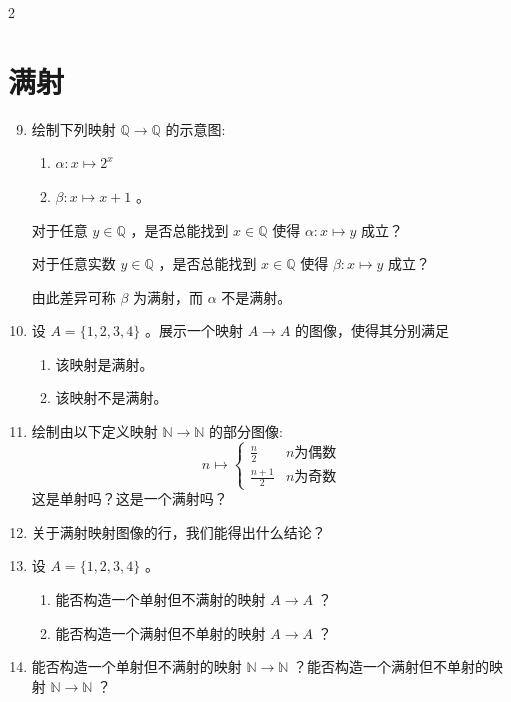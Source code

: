 \documentclass[12pt]{ctexart}
\begin{document}
\begin{multicols}{2}
\section*{满射}

\begin{enumerate}
  \setcounter{enumi}{8}
\item 绘制下列映射 \(\mathbb{Q} \rightarrow  \mathbb{Q}\) 的示意图:
\begin{enumerate}
\item \(\alpha  : x \mapsto  {2}^{x}\) 
\item \(\beta  : x \mapsto  x + 1\) 。
\end{enumerate}
对于任意 \(y \in \mathbb{Q}\) ，是否总能找到 \(x \in \mathbb{Q}\) 使得 \(\alpha  : x \mapsto  y\) 成立？

对于任意实数 \(y \in \mathbb{Q}\) ，是否总能找到 \(x\in \mathbb{Q}\) 使得 \(\beta  : x \mapsto  y\) 成立？

由此差异可称 \(\beta\) 为满射，而 \(\alpha\) 不是满射。

\item  设 \(A = \{ 1,2,3,4\}\) 。展示一个映射 \(A \rightarrow  A\) 的图像，使得其分别满足
\begin{enumerate}
\item 该映射是满射。
\item 该映射不是满射。
\end{enumerate}


\item  绘制由以下定义映射 \(\mathbb{N} \rightarrow  \mathbb{N}\) 的部分图像:
  $$
n \mapsto
\begin{cases}
  \frac{n}{2} & n \text{为偶数} \\
  \frac{n+1}{2} & n \text{为奇数}
\end{cases}
  $$
这是单射吗？这是一个满射吗？

\item  关于满射映射图像的行，我们能得出什么结论？

\item  设 \(A = \{ 1,2,3,4\}\) 。
\begin{enumerate}
\item 能否构造一个单射但不满射的映射 \(A \rightarrow  A\) ？
\item 能否构造一个满射但不单射的映射 \(A \rightarrow  A\) ？
\end{enumerate}

\item 能否构造一个单射但不满射的映射 \(\mathbb{N} \rightarrow  \mathbb{N}\) ？能否构造一个满射但不单射的映射 \(\mathbb{N} \rightarrow  \mathbb{N}\) ？


\end{enumerate}
\end{multicols}
\end{document}
